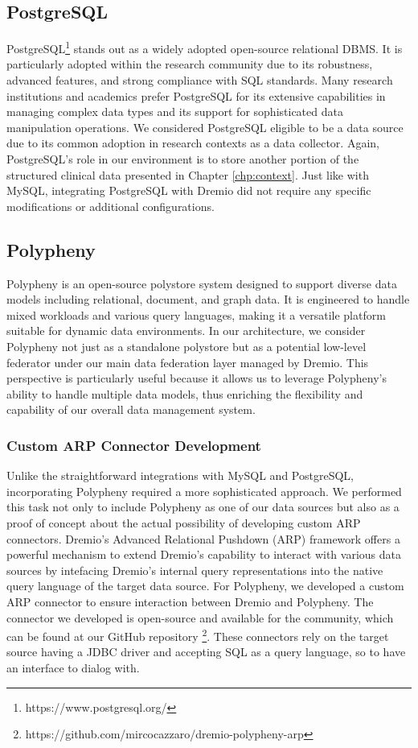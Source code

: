 \subsection{PostgreSQL}
PostgreSQL\footnote{https://www.postgresql.org/} stands out as a widely adopted open-source relational \ac{DBMS}. It is particularly adopted within the research community due to its robustness, advanced features, and strong compliance with SQL standards. Many research institutions and academics prefer PostgreSQL for its extensive capabilities in managing complex data types and its support for sophisticated data manipulation operations. We considered PostgreSQL eligible to be a data source due to its common adoption in research contexts as a data collector.
Again, PostgreSQL's role in our environment is to store another portion of the structured clinical data presented in Chapter \ref{chp:context}.
Just like with MySQL, integrating PostgreSQL with Dremio did not require any specific modifications or additional configurations.

\subsection{Polypheny}
Polypheny \cite{DBLP:conf/bigdataconf/VogtSS18} is an open-source polystore system designed to support diverse data models including relational, document, and graph data. It is engineered to handle mixed workloads and various query languages, making it a versatile platform suitable for dynamic data environments.
In our architecture, we consider Polypheny not just as a standalone polystore but as a potential low-level federator under our main data federation layer managed by Dremio. This perspective is particularly useful because it allows us to leverage Polypheny's ability to handle multiple data models, thus enriching the flexibility and capability of our overall data management system.

\subsubsection{Custom ARP Connector Development}
Unlike the straightforward integrations with MySQL and PostgreSQL, incorporating Polypheny required a more sophisticated approach. We performed this task not only to include Polypheny as one of our data sources but also as a proof of concept about the actual possibility of developing custom ARP connectors.
Dremio's Advanced Relational Pushdown (ARP) framework offers a powerful mechanism to extend Dremio's capability to interact with various data sources by intefacing Dremio's internal query representations into the native query language of the target data source.
For Polypheny, we developed a custom ARP connector to ensure interaction between Dremio and Polypheny. The connector we developed is open-source and available for the community, which can be found at our GitHub repository \footnote{https://github.com/mircocazzaro/dremio-polypheny-arp}.
These connectors rely on the target source having a \ac{JDBC} driver and accepting SQL as a query language, so to have an interface to dialog with.

